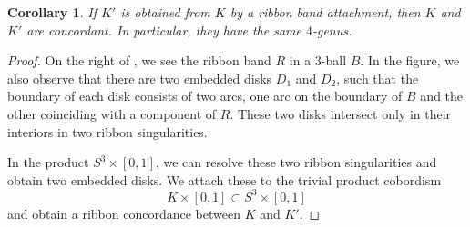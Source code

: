 \documentclass[10pt,a4paper]{amsart}
\newtheorem{cor}{Corollary}
\begin{document}
 \begin{cor}\label{cor:ribbon}
     If $K'$ is obtained from $K$ by a ribbon band attachment, then $K$ and $K'$ are concordant. In particular, they have the same $4$-genus.
 \end{cor}

 \begin{proof}
    On the right of , we see the ribbon band $R$ in a $3$-ball $B$. In the figure, we also observe that there are two embedded disks $D_1$ and $D_2$, such that the boundary of each disk consists of two arcs, one arc on the boundary of $B$ and the other coinciding with a component of $R$. These two disks intersect only in their interiors in two ribbon singularities.

    In the product $S^3 \times [0,1]$, we can resolve these two ribbon singularities and obtain two embedded disks. We attach these to the trivial product cobordism 
\[
K \times [0,1] \subset S^3 \times [0,1]
\]
and obtain a ribbon concordance between $K$ and $K'$.
 \end{proof}
\end{document}
